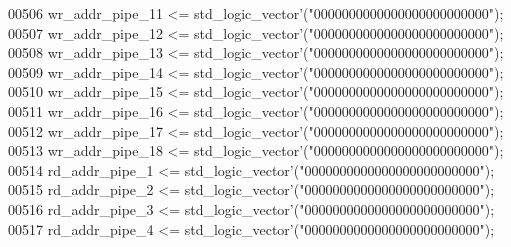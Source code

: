 \begin{DoxyCode}
00506       \textcolor{vhdlchar}{wr_addr_pipe_11} \textcolor{vhdlchar}{<=} \textcolor{comment}{std\_logic\_vector}\textcolor{vhdlchar}{'}\textcolor{vhdlchar}{(}\textcolor{vhdllogic}{"0000000000000000000000000"}\textcolor{vhdlchar}{)};
00507       \textcolor{vhdlchar}{wr_addr_pipe_12} \textcolor{vhdlchar}{<=} \textcolor{comment}{std\_logic\_vector}\textcolor{vhdlchar}{'}\textcolor{vhdlchar}{(}\textcolor{vhdllogic}{"0000000000000000000000000"}\textcolor{vhdlchar}{)};
00508       \textcolor{vhdlchar}{wr_addr_pipe_13} \textcolor{vhdlchar}{<=} \textcolor{comment}{std\_logic\_vector}\textcolor{vhdlchar}{'}\textcolor{vhdlchar}{(}\textcolor{vhdllogic}{"0000000000000000000000000"}\textcolor{vhdlchar}{)};
00509       \textcolor{vhdlchar}{wr_addr_pipe_14} \textcolor{vhdlchar}{<=} \textcolor{comment}{std\_logic\_vector}\textcolor{vhdlchar}{'}\textcolor{vhdlchar}{(}\textcolor{vhdllogic}{"0000000000000000000000000"}\textcolor{vhdlchar}{)};
00510       \textcolor{vhdlchar}{wr_addr_pipe_15} \textcolor{vhdlchar}{<=} \textcolor{comment}{std\_logic\_vector}\textcolor{vhdlchar}{'}\textcolor{vhdlchar}{(}\textcolor{vhdllogic}{"0000000000000000000000000"}\textcolor{vhdlchar}{)};
00511       \textcolor{vhdlchar}{wr_addr_pipe_16} \textcolor{vhdlchar}{<=} \textcolor{comment}{std\_logic\_vector}\textcolor{vhdlchar}{'}\textcolor{vhdlchar}{(}\textcolor{vhdllogic}{"0000000000000000000000000"}\textcolor{vhdlchar}{)};
00512       \textcolor{vhdlchar}{wr_addr_pipe_17} \textcolor{vhdlchar}{<=} \textcolor{comment}{std\_logic\_vector}\textcolor{vhdlchar}{'}\textcolor{vhdlchar}{(}\textcolor{vhdllogic}{"0000000000000000000000000"}\textcolor{vhdlchar}{)};
00513       \textcolor{vhdlchar}{wr_addr_pipe_18} \textcolor{vhdlchar}{<=} \textcolor{comment}{std\_logic\_vector}\textcolor{vhdlchar}{'}\textcolor{vhdlchar}{(}\textcolor{vhdllogic}{"0000000000000000000000000"}\textcolor{vhdlchar}{)};
00514       \textcolor{vhdlchar}{rd_addr_pipe_1} \textcolor{vhdlchar}{<=} \textcolor{comment}{std\_logic\_vector}\textcolor{vhdlchar}{'}\textcolor{vhdlchar}{(}\textcolor{vhdllogic}{"0000000000000000000000000"}\textcolor{vhdlchar}{)};
00515       \textcolor{vhdlchar}{rd_addr_pipe_2} \textcolor{vhdlchar}{<=} \textcolor{comment}{std\_logic\_vector}\textcolor{vhdlchar}{'}\textcolor{vhdlchar}{(}\textcolor{vhdllogic}{"0000000000000000000000000"}\textcolor{vhdlchar}{)};
00516       \textcolor{vhdlchar}{rd_addr_pipe_3} \textcolor{vhdlchar}{<=} \textcolor{comment}{std\_logic\_vector}\textcolor{vhdlchar}{'}\textcolor{vhdlchar}{(}\textcolor{vhdllogic}{"0000000000000000000000000"}\textcolor{vhdlchar}{)};
00517       \textcolor{vhdlchar}{rd_addr_pipe_4} \textcolor{vhdlchar}{<=} \textcolor{comment}{std\_logic\_vector}\textcolor{vhdlchar}{'}\textcolor{vhdlchar}{(}\textcolor{vhdllogic}{"0000000000000000000000000"}\textcolor{vhdlchar}{)};

\end{DoxyCode}
